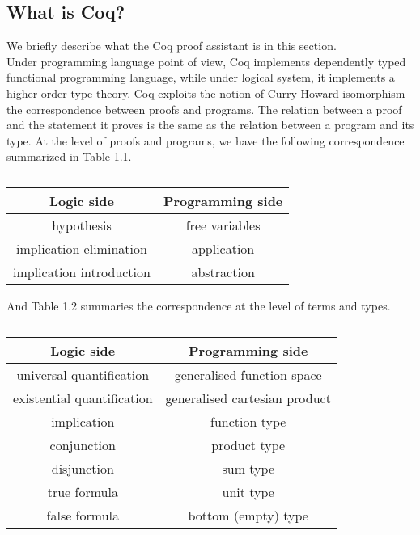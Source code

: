 \subsection{What is Coq?}
We briefly describe what the Coq proof assistant is in this section.\\
Under programming language point of view, Coq implements dependently typed functional programming language, while under logical system, it implements a higher-order type theory. Coq exploits the notion of Curry-Howard isomorphism - the correspondence between proofs and programs. The relation between a proof and the statement it proves is the same as the relation between a program and its type. At the level of proofs and programs, we have the following correspondence summarized in Table 1.1.
\begin{table}[h!]
\begin{center}
	\begin{tabular}{|c|c|}
		\hline 
		Logic side & Programming side \\ \hline
		hypothesis & free variables \\ \hline
		implication elimination & application \\ \hline
		implication introduction & abstraction \\ \hline
	\end{tabular}
\end{center}
\caption{}
\end{table}
And Table 1.2 summaries the correspondence at the level of terms and types.
\begin{table}[h!]
\begin{center}
	\begin{tabular}{|c|c|}
		\hline
			Logic side & Programming side \\ \hline 
			universal quantification & generalised function space \\ \hline
			existential quantification & generalised cartesian product \\ \hline
			implication	& function type \\ \hline
			conjunction	& product type \\ \hline
			disjunction	& sum type \\ \hline
			true formula & unit type \\ \hline
			false formula & bottom (empty) type \\ \hline
	\end{tabular}
\end{center}
\caption{}
\end{table}
